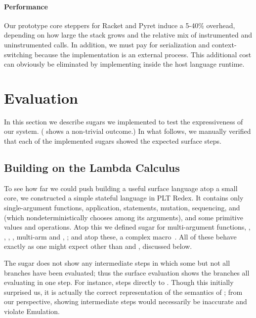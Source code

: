 \paragraph{Performance}

Our prototype core steppers for Racket and Pyret induce a
5-40\% overhead, depending on how large the stack grows and the
relative mix of instrumented and uninstrumented calls. In addition, we
must pay for serialization and context-switching because the
{\Resugarer} implementation is an external process. This additional
cost can obviously be eliminated by implementing {\Resugarer} inside
the host language runtime.

\section{Evaluation}
\label{sec:reval-examples}

In this section we describe sugars we implemented to test the
expressiveness of our system. 
( shows a non-trivial outcome.)
In what follows, we manually
verified that each of the implemented sugars showed the expected
surface steps.

\subsection{Building on the Lambda Calculus}

To see how far we could push building a useful surface language atop a
small core, we constructed a
simple stateful language in PLT Redex.  It contains only
single-argument functions, application,  statements,
mutation, sequencing, and  (which nondeterministically
chooses among its arguments), and some primitive values and operations.
Atop this we defined sugar for
multi-argument functions, , , ,
, multi-arm  and , ;
and atop these, a complex  macro~\cite{sk:automata-macros}.
All of
these behave exactly as one might expect other than  and
, discussed below.

The  sugar does not show any intermediate steps in which
some but not all branches have been evaluated; thus the surface
evaluation shows the branches all evaluating in one step. For instance,
 steps directly to
. Though this initially
surprised us, it is actually the correct representation of the
semantics of ; from our perspective,
showing intermediate steps would necessarily be
inaccurate and violate Emulation.

